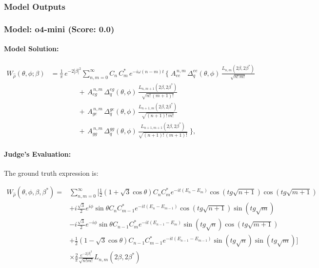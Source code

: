 \documentclass[10pt]{article}
\begin{document}
\subsubsection*{Model Outputs}
\subsubsection*{Model: o4-mini (Score: 0.0)}
\paragraph*{Model Solution:}
\[ \begin{aligned}
W_{\hat\rho}(\theta,\phi;\beta)
&=\frac{1}{\pi}\,e^{-2|\beta|^2}
\sum_{n,m=0}^\infty
C_n\,C_m^*\,e^{-i\omega(n - m)t}\,
\Biggl\{\;
A_{ee}^{\,n,m}\,\Delta_q^{ee}(\theta,\phi)\,
\frac{L_{n,m}(2\beta,2\beta^*)}{\sqrt{n!\,m!}}\\
&\qquad\qquad
+\,A_{eg}^{\,n,m}\,\Delta_q^{eg}(\theta,\phi)\,
\frac{L_{n,m+1}(2\beta,2\beta^*)}{\sqrt{n!\,(m+1)!}}\\
&\qquad\qquad
+\,A_{ge}^{\,n,m}\,\Delta_q^{ge}(\theta,\phi)\,
\frac{L_{n+1,m}(2\beta,2\beta^*)}{\sqrt{(n+1)!\,m!}}\\
&\qquad\qquad
+\,A_{gg}^{\,n,m}\,\Delta_q^{gg}(\theta,\phi)\,
\frac{L_{n+1,m+1}(2\beta,2\beta^*)}{\sqrt{(n+1)!\,(m+1)!}}
\;\Biggr\},
\end{aligned} \]

\paragraph*{Judge's Evaluation:}

The ground truth expression is:

\[
\begin{aligned}
W_{\hat{\rho}}(\theta, \phi, \beta,\beta^{*}) = & \sum_{n,m=0}^{\infty}\Bigg[
\frac{1}{2}(1+\sqrt{3}\cos\theta) C_n C_m^{*} e^{-it(E_n-E_m)} \cos(tg\sqrt{n+1}) \cos(tg\sqrt{m+1}) \\
& + i\frac{\sqrt{3}}{2} e^{i\phi} \sin\theta C_n C_{m-1}^{*} e^{-it(E_n - E_{m-1})} \cos(tg\sqrt{n+1}) \sin(tg\sqrt{m}) \\
& - i\frac{\sqrt{3}}{2} e^{-i\phi} \sin\theta C_{n-1} C_m^{*} e^{-it(E_{n-1} - E_m)} \sin(tg\sqrt{n}) \cos(tg\sqrt{m+1}) \\
& + \frac{1}{2}(1 - \sqrt{3} \cos\theta) C_{n-1} C_{m-1}^{*} e^{-it(E_{n-1} - E_{m-1})} \sin(tg\sqrt{n}) \sin(tg\sqrt{m})
\Bigg] \\
& \times \frac{2}{\pi} \frac{e^{-2|\beta|^{2}}}{\sqrt{n! m!}} L_{n,m}(2\beta, 2\beta^{*})
\end{aligned}
\]
\end{document}
